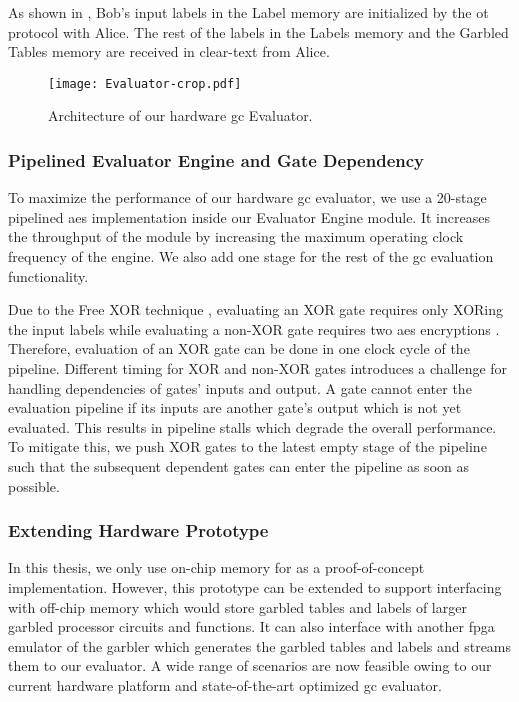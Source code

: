 As shown in , Bob's input labels in the Label memory are initialized by the \acrshort{ot} protocol with Alice.
The rest of the labels in the Labels memory and the Garbled Tables memory are received in clear-text from Alice.

\begin{figure}
\centering
\texttt{[image: Evaluator-crop.pdf]}
\caption{Architecture of our hardware \acrshort{gc} Evaluator.}
\label{fig:evaluator}
\end{figure}

\subsubsection{Pipelined Evaluator Engine and Gate Dependency} \label{ssec:processor-hardware-pipeline}
To maximize the performance of our hardware \acrshort{gc} evaluator, we use a 20-stage pipelined \acrshort{aes} implementation \cite{hsing2013tiny} inside our Evaluator Engine module.
It increases the throughput of the module by increasing the maximum operating clock frequency of the engine.
We also add one stage for the rest of the \acrshort{gc} evaluation functionality.

Due to the Free XOR technique \cite{kolesnikov2008improved}, evaluating an XOR gate requires only XORing the input labels while evaluating a non-XOR gate requires two \acrshort{aes} encryptions \cite{zahur2015two}.
Therefore, evaluation of an XOR gate can be done in one clock cycle of the pipeline.
Different timing for XOR and non-XOR gates introduces a challenge for handling dependencies of gates' inputs and output.
A gate cannot enter the evaluation pipeline if its inputs are another gate's output which is not yet evaluated.
This results in pipeline stalls which degrade the overall performance.
To mitigate this, we push XOR gates to the latest empty stage of the pipeline such that the subsequent dependent gates can enter the pipeline as soon as possible.

\subsubsection{Extending Hardware Prototype} \label{ssec:processor-hardware-extend}
In this thesis, we only use on-chip memory for as a proof-of-concept implementation.
However, this prototype can be extended to support interfacing with off-chip memory which would store garbled tables and labels of larger garbled processor circuits and functions.
It can also interface with another \acrshort{fpga} emulator of the garbler which generates the garbled tables and labels and streams them to our evaluator.
A wide range of scenarios are now feasible owing to our current hardware platform and state-of-the-art optimized \acrshort{gc} evaluator.

